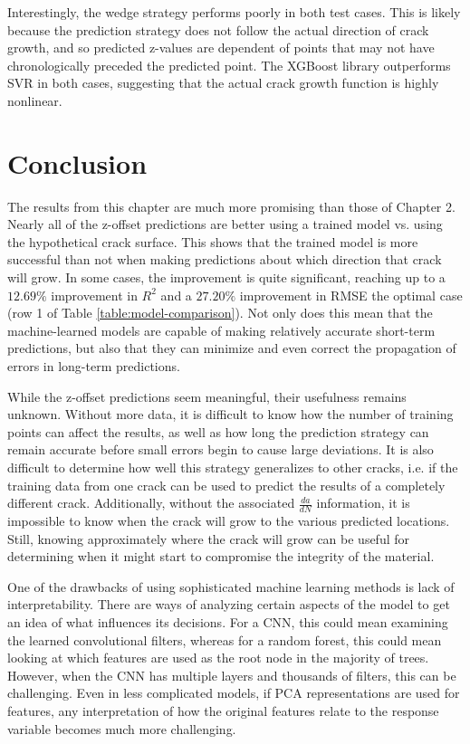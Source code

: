 Interestingly, the wedge strategy performs poorly in both test cases.  This is likely because the prediction strategy does not follow the actual direction of crack growth, and so predicted z-values are dependent of points that may not have chronologically preceded the predicted point.  The XGBoost library outperforms SVR in both cases, suggesting that the actual crack growth function is highly nonlinear.

\section{Conclusion}
The results from this chapter are much more promising than those of Chapter 2.  Nearly all of the z-offset predictions are better using a trained model vs. using the hypothetical crack surface.  This shows that the trained model is more successful than not when making predictions about which direction that crack will grow.  In some cases, the improvement is quite significant, reaching up to a $12.69\%$ improvement in $R^2$ and a $27.20\%$ improvement in RMSE the optimal case (row 1 of Table \ref{table:model-comparison}).  Not only does this mean that the machine-learned models are capable of making relatively accurate short-term predictions, but also that they can minimize and even correct the propagation of errors in long-term predictions.

While the z-offset predictions seem meaningful, their usefulness remains unknown.  Without more data, it is difficult to know how the number of training points can affect the results, as well as how long the prediction strategy can remain accurate before small errors begin to cause large deviations.  It is also difficult to determine how well this strategy generalizes to other cracks, i.e. if the training data from one crack can be used to predict the results of a completely different crack.  Additionally, without the associated $\frac{da}{dN}$ information, it is impossible to know when the crack will grow to the various predicted locations.  Still, knowing approximately where the crack will grow can be useful for determining when it might start to compromise the integrity of the material.

One of the drawbacks of using sophisticated machine learning methods is lack of interpretability.  There are ways of analyzing certain aspects of the model to get an idea of what influences its decisions.  For a CNN, this could mean examining the learned convolutional filters, whereas for a random forest, this could mean looking at which features are used as the root node in the majority of trees.  However, when the CNN has multiple layers and thousands of filters, this can be challenging.  Even in less complicated models, if PCA representations are used for features, any interpretation of how the original features relate to the response variable becomes much more challenging.

